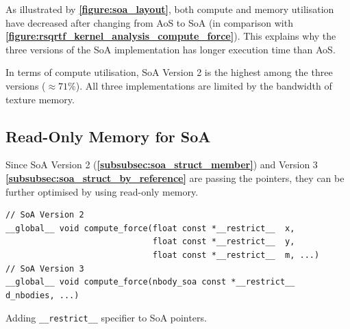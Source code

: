 \documentclass[12pt, a4paper]{article}
\let\oldcref\cref
\renewcommand{\cref}[1]{\textbf{\oldcref{#1}}}
\begin{document}
As illustrated by \cref{figure:soa_layout}, both compute and memory utilisation have decreased after
changing from AoS to SoA (in comparison with \cref{figure:rsqrtf_kernel_analysis_compute_force}).
This explains why the three versions of the SoA implementation has longer execution time than AoS.

In terms of compute utilisation, SoA Version 2 is the highest among the three versions (\(\approx
71\%\)). All three implementations are limited by the bandwidth of texture memory.

\subsection{Read-Only Memory for SoA}
Since SoA Version 2 (\cref{subsubsec:soa_struct_member}) and Version 3
\cref{subsubsec:soa_struct_by_reference} are passing the pointers, they can be further optimised by
using read-only memory.

\begin{listing}[H]
  \begin{verbatim}
// SoA Version 2
__global__ void compute_force(float const *__restrict__  x,
                              float const *__restrict__  y,
                              float const *__restrict__  m, ...)
// SoA Version 3
__global__ void compute_force(nbody_soa const *__restrict__  d_nbodies, ...)
  \end{verbatim}
  \caption{Adding \texttt{__restrict__} specifier to SoA pointers.}
\end{listing}
\end{document}
